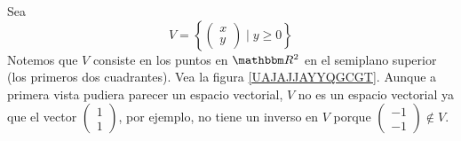 \begin{example}
    Sea
    $$V = \left\{\begin{pmatrix} x \\ y \end{pmatrix} \mid y \geq 0\right\}$$
    Notemos que $V$ consiste en los puntos en $\RR[2]$ en el semiplano superior (los primeros dos cuadrantes). Vea la figura \ref{UAJAJJAYYQGCGT}. Aunque a primera vista pudiera parecer un espacio vectorial, $V$ no es un espacio vectorial ya que el vector $\begin{pmatrix} 1 \\ 1 \end{pmatrix}$, por ejemplo, no tiene un inverso en $V$ porque $\begin{pmatrix} -1 \\ -1 \end{pmatrix} \notin V$.
\end{example}

